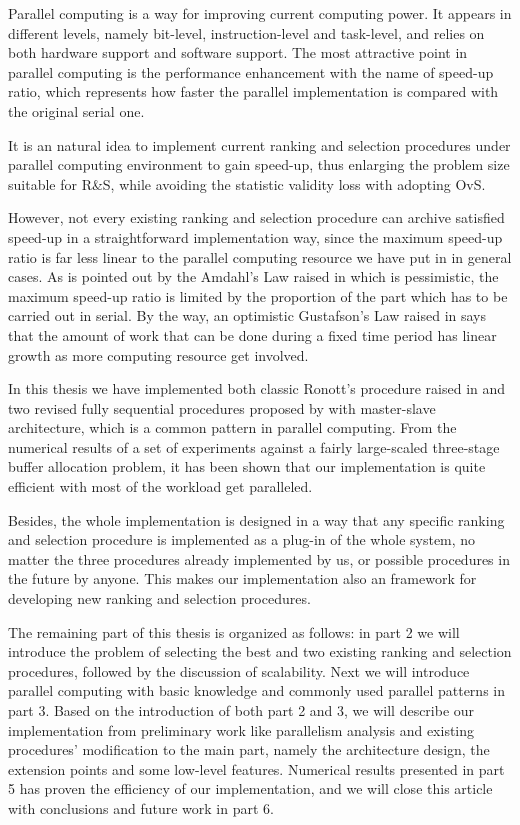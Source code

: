 \documentclass[12pt,a4paper]{report}
\begin{document}
Parallel computing is a way for improving current computing power. It appears in different levels, namely bit-level, instruction-level and task-level, and relies on both hardware support and software support. The most attractive point in parallel computing is the performance enhancement with the name of speed-up ratio, which represents how faster the parallel implementation is compared with the original serial one.

It is an natural idea to implement current ranking and selection procedures under parallel computing environment to gain speed-up, thus enlarging the problem size suitable for R\&S, while avoiding the statistic validity loss with adopting OvS.

However, not every existing ranking and selection procedure can archive satisfied speed-up in a straightforward implementation way, since the maximum speed-up ratio is far less linear to the parallel computing resource we have put in in general cases. As is pointed out by the Amdahl's Law raised in \cite{amdahl} which is pessimistic, the maximum speed-up ratio is limited by the proportion of the part which has to be carried out in serial. By the way, an optimistic Gustafson's Law raised in \cite{gustafson} says that the amount of work that can be done during a fixed time period has linear growth as more computing resource get involved.

In this thesis we have implemented both classic Ronott's procedure raised in \cite{cistam1978rinott} and two revised fully sequential procedures proposed by \cite{ras-seq-parallel} with master-slave architecture, which is a common pattern in parallel computing. From the numerical results of a set of experiments against a fairly large-scaled three-stage buffer allocation problem, it has been shown that our implementation is quite efficient with most of the workload get paralleled.

Besides, the whole implementation is designed in a way that any specific ranking and selection procedure is implemented as a plug-in of the whole system, no matter the three procedures already implemented by us, or possible procedures in the future by anyone. This makes our implementation also an framework for developing new ranking and selection procedures.

The remaining part of this thesis is organized as follows: in part 2 we will introduce the problem of selecting the best and two existing ranking and selection procedures, followed by the discussion of scalability. Next we will introduce parallel computing with basic knowledge and commonly used parallel patterns in part 3. Based on the introduction of both part 2 and 3, we will describe our implementation from preliminary work like parallelism analysis and existing procedures' modification to the main part, namely the architecture design, the extension points and some low-level features. Numerical results presented in part 5 has proven the efficiency of our implementation, and we will close this article with conclusions and future work in part 6.
\end{document}
